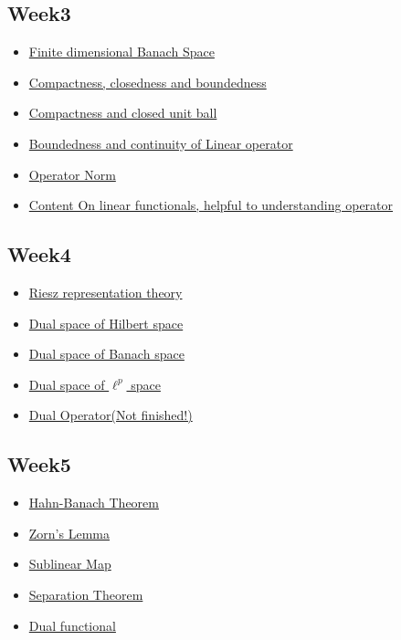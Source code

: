 \subsection{Week3}
\begin{itemize}
	\item \hyperref[finite dimensional Banach]{Finite dimensional Banach Space}

	\item \hyperref[compactness]{Compactness, closedness and boundedness}
	\item \hyperref[compact unit balls]{Compactness and closed unit ball}
	\item \hyperref[continuity of LO]{Boundedness and continuity of Linear operator}
	\item \hyperref[operator norm]{Operator Norm}
	\item \hyperref[Linear Functionals]{\color{red}Content On linear functionals, helpful to understanding operator}
\end{itemize}

\subsection{Week4}
\begin{itemize}
	\item \hyperref[Riesz representation theory]{Riesz representation theory}
	\item \hyperref[dual space Hilbert]{Dual space of Hilbert space}
	\item \hyperref[dual space Banach]{Dual space of Banach space}
	\item \hyperref[lp dual]{Dual space of $\ell^p$ space}
	\item \hyperref[dual operator]{Dual Operator(Not finished!)}
\end{itemize}

\subsection{Week5}
\begin{itemize}
	\item \hyperref[Hahn-Banach Theorem]{Hahn-Banach Theorem}
	\item \hyperref[Zorn's Lemma]{Zorn's Lemma}
	\item \hyperref[sublinear map]{Sublinear Map}
	\item \hyperref[separations]{Separation Theorem}
	\item \hyperref[Dual functional]{Dual functional}
\end{itemize}


